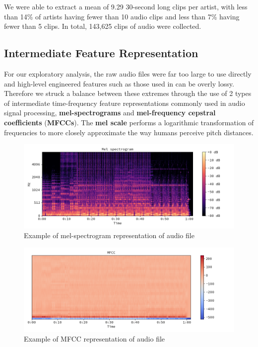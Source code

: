 We were able to extract a mean of 9.29 30-second long clips per artist, with less than 14\% of artists having fewer than 10 audio clips and less than 7\% having fewer than 5 clips. In total, 143,625 clips of audio were collected.

\subsection{Intermediate Feature Representation}
For our exploratory analysis, the raw audio files were far too large to use directly and high-level engineered features such as those used in \cite{shalit2013modeling} can be overly lossy. Therefore we struck a balance between these extremes through the use of 2 types of intermediate time-frequency feature representations commonly \cite{van2013deep} used in audio signal processing, \textbf{mel-spectrograms} and \textbf{mel-frequency cepstral coefficients} (\textbf{MFCCs}). The \textbf{mel scale} performs a logarithmic transformation of frequencies to more closely approximate the way humans perceive pitch distances.

\begin{figure}[H]
\includegraphics[width=\textwidth]{figures/melspec.png}
\caption{Example of mel-spectrogram representation of audio file}
\end{figure}

\begin{figure}[H]
\includegraphics[width=\textwidth]{figures/mfcc.png}
\caption{Example of MFCC representation of audio file}
\end{figure}

